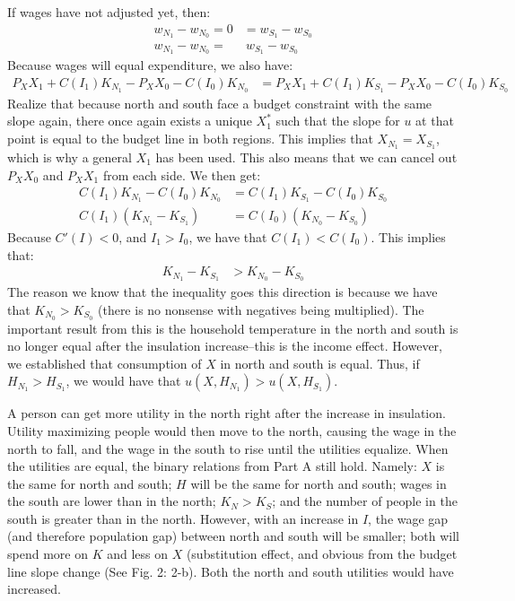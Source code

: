 \documentclass[12pt]{paper}
\begin{document}
If wages have not adjusted yet, then: 
\begin{align*}
w_{N_1}-w_{N_0}=0&=w_{S_1}-w_{S_0}\\
w_{N_1}-w_{N_0}=&~w_{S_1}-w_{S_0}
\end{align*}
Because wages will equal expenditure, we also have:
\begin{align*}
P_XX_1+C(I_1)K_{N_1}-P_XX_0-C(I_0)K_{N_0}&=P_XX_1+C(I_1)K_{S_1}-P_XX_0-C(I_0)K_{S_0}
\end{align*}
Realize that because north and south face a budget constraint with the same slope again, there once again exists a unique $X^*_1$ such that the slope for $u$ at that point is equal to the budget line in both regions. This implies that $X_{N_1}=X_{S_1}$, which is why a general $X_1$ has been used. This also means that we can cancel out $P_XX_0$ and $P_XX_1$ from each side. We then get:
\begin{align*}
C(I_1)K_{N_1}-C(I_0)K_{N_0}&=C(I_1)K_{S_1}-C(I_0)K_{S_0}\\
C(I_1)(K_{N_1}-K_{S_1})&=C(I_0)(K_{N_0}-K_{S_0})
\end{align*}
Because $C'(I)<0$, and $I_1>I_0$, we have that $C(I_1)<C(I_0)$. This implies that:
\begin{align*}
K_{N_1}-K_{S_1}&>K_{N_0}-K_{S_0}
\end{align*}
The reason we know that the inequality goes this direction is because we have that $K_{N_0}>K_{S_0}$ (there is no nonsense with negatives being multiplied). The important result from this is the household temperature in the north and south is no longer equal after the insulation increase--this is the income effect. However, we established that consumption of $X$ in north and south is equal. Thus, if $H_{N_1}>H_{S_1}$, we would have that $u(X,H_{N_1})>u(X,H_{S_1}).$


A person can get more utility in the north right after the increase in insulation. Utility maximizing people would then move to the north, causing the wage in the north to fall, and the wage in the south to rise until the utilities equalize. When the utilities are equal, the binary relations from Part A still hold. Namely: $X$ is the same for north and south; $H$ will be the same for north and south; wages in the south are lower than in the north;  $K_N>K_S$; and the number of people in the south is greater than in the north. However, with an increase in $I$, the wage gap (and therefore population gap) between north and south will be smaller; both will spend more on $K$ and less on $X$ (substitution effect, and obvious from the budget line slope change (See Fig. 2: 2-b). Both the north and south utilities would have increased.
\end{document}
